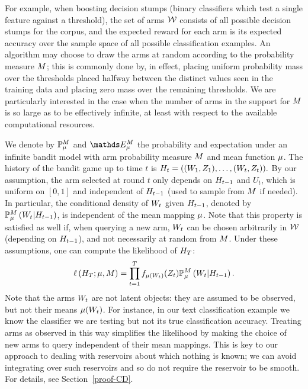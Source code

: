 For example, when boosting decision stumps
(binary classifiers which test a single feature against a threshold),
the set of arms $\mathcal{W}$ consists of all possible decision
stumps for the corpus, and
the expected reward for each arm is its expected accuracy over the sample space 
of all possible classification examples.
An algorithm may choose to draw the arms at random according to the
probability measure $M$;
this is commonly done by, in effect, placing uniform probability mass over the
thresholds placed halfway between the distinct values seen in the training data
and placing zero mass over the remaining thresholds.
We are particularly interested in the case when the number of arms in the
support for $M$ is so large as to be effectively infinite, at least with
respect to the available computational resources.

We denote by $\mathbb{P}_{\mu}^M$ and $\ETrueModelNone$ the probability and 
expectation under an infinite bandit model with arm probability measure
$M$ and mean function $\mu$. The
history of the bandit game up to time $t$ is
$H_t = ((W_1,Z_1),\dots,(W_t,Z_t)).$
By our assumption, the arm selected at round $t$ only depends on
$H_{t-1}$
and $U_t$, which is uniform on $[0,1]$ and independent of
$H_{t-1}$ (used to sample from $M$ if needed).
In particular, the
conditional density of $W_t$ given $H_{t-1}$,
denoted by  $\mathbb{P}_{\mu}^M\left(  W_t | H_{t-1}  \right)$,
is independent of the mean mapping $\mu$. Note that this
property is
satisfied as well if, when querying a new arm, $W_t$ can be chosen
arbitrarily 
in $\mathcal{W}$ (depending on $H_{t-1}$), and not necessarily at random from
$M$. Under these
assumptions, one can compute the likelihood of $H_T$:
%
\vspace{-10pt}
%
\begin{align}
\ell\left(H_T ; \mu,M\right) = \prod_{t=1}^T f_{\mu(W_t)}(Z_t)
\mathbb{P}_{\mu}^M\left(  W_t | H_{t-1}  \right).\label{Likelihood}
\end{align}
Note that the arms $W_t$ are not latent objects: they are assumed to be
observed, but not their means $\mu(W_t)$.
For instance, in our text classification example we know the classifier we are
testing but not its true classification accuracy.
Treating arms as observed in this way simplifies the likelihood by making the
choice of new arms to query independent of their mean mappings.
This is key to our approach to dealing with reservoirs about which nothing
is known; we can avoid integrating over such reservoirs and so do not require
the reservoir to be smooth.
For details, see Section~\ref{proof-CD}.

